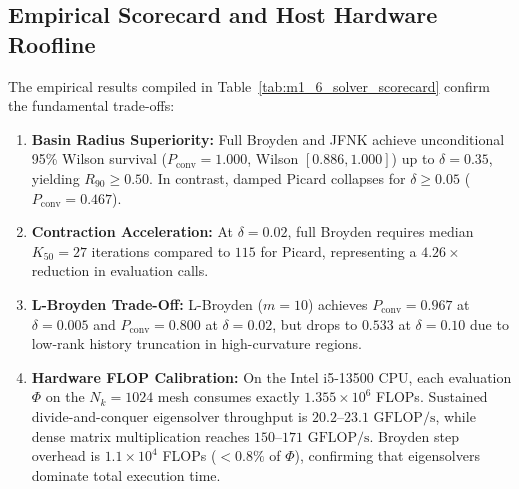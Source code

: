 



\subsection{Empirical Scorecard and Host Hardware Roofline}
The empirical results compiled in Table~\ref{tab:m1_6_solver_scorecard} confirm the fundamental trade-offs:
\begin{enumerate}
\item \textbf{Basin Radius Superiority:} Full Broyden and JFNK achieve unconditional 95\% Wilson survival ($P_{\mathrm{conv}} = 1.000$, Wilson $[0.886, 1.000]$) up to $\delta = 0.35$, yielding $R_{90} \ge 0.50$. In contrast, damped Picard collapses for $\delta \ge 0.05$ ($P_{\mathrm{conv}} = 0.467$).
\item \textbf{Contraction Acceleration:} At $\delta = 0.02$, full Broyden requires median $K_{50} = 27$ iterations compared to $115$ for Picard, representing a $4.26\times$ reduction in evaluation calls.
\item \textbf{L-Broyden Trade-Off:} L-Broyden ($m=10$) achieves $P_{\mathrm{conv}} = 0.967$ at $\delta = 0.005$ and $P_{\mathrm{conv}} = 0.800$ at $\delta = 0.02$, but drops to $0.533$ at $\delta = 0.10$ due to low-rank history truncation in high-curvature regions.
\item \textbf{Hardware FLOP Calibration:} On the Intel i5-13500 CPU, each evaluation $\Phi$ on the $N_k=1024$ mesh consumes exactly $1.355\times 10^6$ FLOPs. Sustained divide-and-conquer eigensolver throughput is $20.2\text{--}23.1\text{ GFLOP/s}$, while dense matrix multiplication reaches $150\text{--}171\text{ GFLOP/s}$. Broyden step overhead is $1.1\times 10^4$ FLOPs ($<0.8\%$ of $\Phi$), confirming that eigensolvers dominate total execution time.
\end{enumerate}

